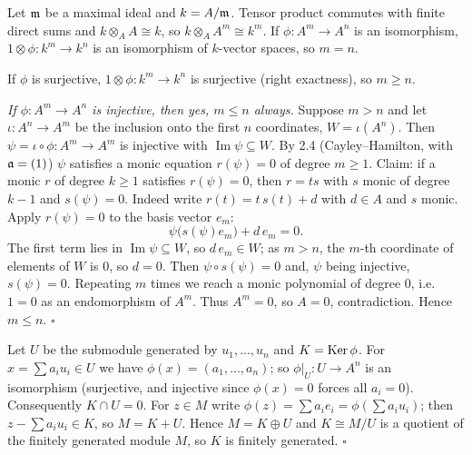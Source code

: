 \documentclass[11pt]{article}
\begin{document}
\pf
Let $\mathfrak m$ be a maximal ideal and $k=A/\mathfrak m$. Tensor product commutes with finite direct sums and $k\otimes_AA\cong k$, so $k\otimes_AA^m\cong k^m$. If $\phi:A^m\to A^n$ is an isomorphism, $1\otimes\phi:k^m\to k^n$ is an isomorphism of $k$-vector spaces, so $m=n$.

If $\phi$ is surjective, $1\otimes\phi:k^m\to k^n$ is surjective (right exactness), so $m\ge n$.

\emph{If $\phi:A^m\to A^n$ is injective, then yes, $m\le n$ always.} Suppose $m>n$ and let $\iota:A^n\to A^m$ be the inclusion onto the first $n$ coordinates, $W=\iota(A^n)$. Then $\psi=\iota\circ\phi:A^m\to A^m$ is injective with $\operatorname{Im}\psi\subseteq W$. By 2.4 (Cayley--Hamilton, with $\mathfrak a=(1)$) $\psi$ satisfies a monic equation $r(\psi)=0$ of degree $m\ge1$. Claim: if a monic $r$ of degree $k\ge1$ satisfies $r(\psi)=0$, then $r=ts$ with $s$ monic of degree $k-1$ and $s(\psi)=0$. Indeed write $r(t)=t\,s(t)+d$ with $d\in A$ and $s$ monic. Apply $r(\psi)=0$ to the basis vector $e_m$:
\[
\psi\bigl(s(\psi)e_m\bigr)+d\,e_m=0 .
\]
The first term lies in $\operatorname{Im}\psi\subseteq W$, so $d\,e_m\in W$; as $m>n$, the $m$-th coordinate of elements of $W$ is $0$, so $d=0$. Then $\psi\circ s(\psi)=0$ and, $\psi$ being injective, $s(\psi)=0$. Repeating $m$ times we reach a monic polynomial of degree $0$, i.e.\ $1=0$ as an endomorphism of $A^m$. Thus $A^m=0$, so $A=0$, contradiction. Hence $m\le n$. \hfill$\square$

\pf
Let $U$ be the submodule generated by $u_1,\dots,u_n$ and $K=\operatorname{Ker}\phi$. For $x=\sum a_iu_i\in U$ we have $\phi(x)=(a_1,\dots,a_n)$; so $\phi|_U:U\to A^n$ is an isomorphism (surjective, and injective since $\phi(x)=0$ forces all $a_i=0$). Consequently $K\cap U=0$. For $z\in M$ write $\phi(z)=\sum a_ie_i=\phi(\sum a_iu_i)$; then $z-\sum a_iu_i\in K$, so $M=K+U$. Hence $M=K\oplus U$ and $K\cong M/U$ is a quotient of the finitely generated module $M$, so $K$ is finitely generated. \hfill$\square$
\end{document}
